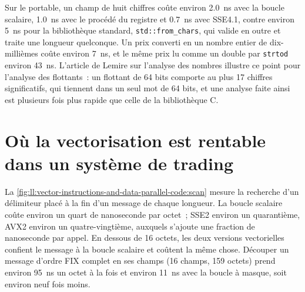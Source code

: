 Sur le portable, un champ de huit chiffres coûte environ \qty{2.0}{\nano\second} avec la boucle scalaire, \qty{1.0}{\nano\second} avec le
procédé du registre et \qty{0.7}{\nano\second} avec SSE4.1, contre environ \qty{5}{\nano\second} pour la
bibliothèque standard, \texttt{std::from\_chars}, qui valide en outre et traite une longueur quelconque. Un prix converti en un nombre entier de
dix-millièmes coûte environ \qty{7}{\nano\second}, et le même prix lu comme un double par \texttt{strtod} environ
\qty{43}{\nano\second}. L'article de Lemire sur l'analyse des nombres illustre ce point pour l'analyse des flottants~: un flottant de 64 bits comporte au plus
17 chiffres significatifs, qui tiennent dans un seul mot de 64 bits, et une analyse faite ainsi est plusieurs fois plus rapide que celle de la bibliothèque C.

\section{Où la vectorisation est rentable dans un système de trading}

La \cref{fig:ll:vector-instructions-and-data-parallel-code:scan} mesure la recherche d'un délimiteur placé à la
fin d'un message de chaque longueur. La boucle scalaire coûte environ un quart de nanoseconde par octet~; SSE2 environ un quarantième, AVX2 environ un
quatre-vingtième, auxquels s'ajoute une fraction de nanoseconde par appel. En dessous de 16 octets, les deux versions vectorielles confient le message à la boucle scalaire
et coûtent la même chose. Découper un message d'ordre FIX complet en ses champs (16 champs, 159 octets) prend environ
\qty{95}{\nano\second} un octet à la fois et environ \qty{11}{\nano\second} avec la boucle à masque, soit environ neuf fois moins.

